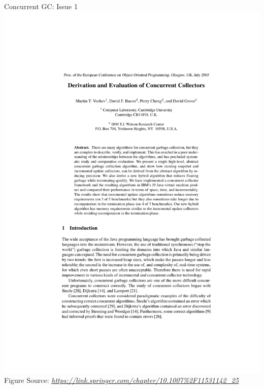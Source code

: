 \documentclass[
14pt,
aspectratio=169,
usenames,
dvipsnames,
x11names]{beamer}
\newcommand{\src}[1]{\scriptsize Figure Source: \textit{#1}}
\begin{document}
\begin{frame}{Concurrent GC: Issue 1}
  \centering
  \includegraphics[page=8,trim=4cm 20.5cm 4cm 6cm,clip,width=\linewidth]{Vechev05Derivation}\\
  \src{\url{https://link.springer.com/chapter/10.1007\%2F11531142_25}}
\end{frame}
\end{document}
